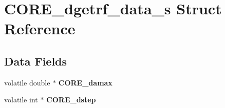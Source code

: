 \hypertarget{structCORE__dgetrf__data__s}{}\section{C\+O\+R\+E\+\_\+dgetrf\+\_\+data\+\_\+s Struct Reference}
\label{structCORE__dgetrf__data__s}
\subsection*{Data Fields}
\begin{DoxyCompactItemize}
\item 
\hypertarget{structCORE__dgetrf__data__s_a7f572d5c63c34015a8f0213b49888c91}{}volatile double $\ast$ {\bfseries C\+O\+R\+E\+\_\+damax}\label{structCORE__dgetrf__data__s_a7f572d5c63c34015a8f0213b49888c91}

\item 
\hypertarget{structCORE__dgetrf__data__s_a0c35771233775e4eec00bcb5a78ca3e5}{}volatile int $\ast$ {\bfseries C\+O\+R\+E\+\_\+dstep}\label{structCORE__dgetrf__data__s_a0c35771233775e4eec00bcb5a78ca3e5}

\end{DoxyCompactItemize}

